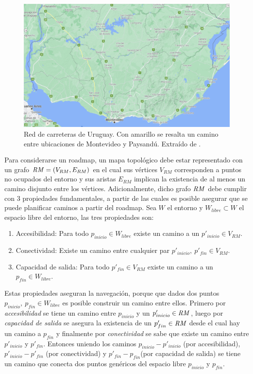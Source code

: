 \begin{figure}[H]
  \center
  \includegraphics[width=0.9\linewidth]{imagenes/uruguayvialMarcado.png}
  \caption[Red de carreteras de Uruguay.]{Red de carreteras de Uruguay. Con amarillo se resalta un camino entre ubicaciones de Montevideo y Paysandú. Extraído de \cite{googlemaps}.}\label{fig:ejemplovial}
\end{figure} 

Para considerarse un roadmap, un mapa topológico debe estar representado
con un grafo $\mathit{RM}=(V_{RM},E_{RM})$ en el cual sus vértices $V_{RM}$
corresponden a puntos no ocupados del entorno y sus aristas $E_{RM}$
implican la existencia de al menos un camino disjunto entre los
vértices. Adicionalmente, dicho grafo $\mathit{RM}$ debe cumplir con 3
propiedades fundamentales, a partir de las cuales es posible asegurar
que se puede planificar caminos a partir del roadmap. Sea $W$ el entorno
y $W_{libre} \subset W$ el espacio libre del entorno, las tres
propiedades son:

\begin{enumerate}
  \item Accesibilidad: Para todo $p_{inicio} \in W_{libre}$ existe un camino a un $p'_{inicio}\in V_{RM}$. %
  \item Conectividad: Existe un camino entre cualquier par $p'_{inicio},\ p'_{fin} \in V_{RM}$.
  \item Capacidad de salida: Para todo $p'_{fin} \in V_{RM}$ existe un camino a un $p_{fin} \in W_{libre}$.
\end{enumerate}

Estas propiedades aseguran la navegación, porque que dados dos puntos $p_{inicio},\ p_{fin}\in W_{libre}$ es posible construir un camino entre ellos. Primero por \emph{accesibilidad} se tiene un camino entre $p_{inicio}$ y un $p'_{inicio}\in \mathit{RM}$, luego por \emph{capacidad de salida} se asegura la existencia de un  $p'_{fin}\in \mathit{RM}$ desde el cual hay un camino a $p_{fin}$ y finalmente por \emph{conectividad} se sabe que existe un camino entre $p'_{inicio}$ y $p'_{fin}$. Entonces uniendo los caminos $p_{inicio} - p'_{inicio}$ (por accesibilidad), $p'_{inicio} - p'_{fin}$ (por conectividad) y $p'_{fin} - p_{fin}$(por capacidad de salida) se tiene un camino que conecta dos puntos genéricos del espacio libre $p_{inicio}$ y $p_{fin}$.

